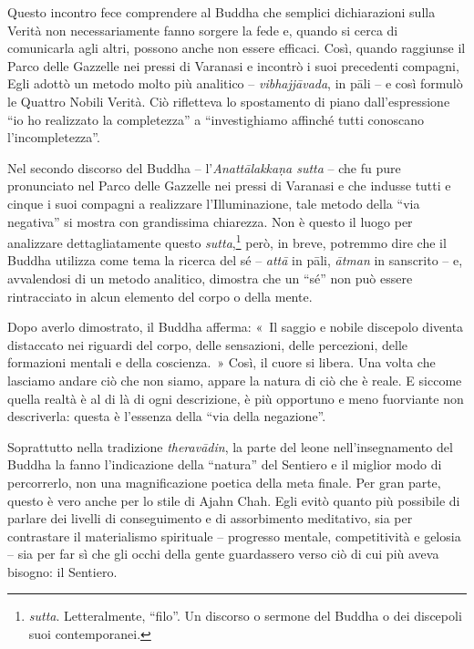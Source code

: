 Questo incontro fece comprendere al Buddha che semplici dichiarazioni
sulla Verità non necessariamente fanno sorgere la fede e, quando si
cerca di comunicarla agli altri, possono anche non essere efficaci.
Così, quando raggiunse il Parco delle Gazzelle nei pressi di Varanasi e
incontrò i suoi precedenti compagni, Egli adottò un metodo molto più
analitico -- \emph{vibhajjāvada}, in pāli -- e così formulò le Quattro
Nobili Verità. Ciò rifletteva lo spostamento di piano dall'espressione
``io ho realizzato la completezza'' a ``investighiamo affinché tutti
conoscano l'incompletezza''.

Nel secondo discorso del Buddha -- l'\emph{Anattālakkaṇa sutta} -- che
fu pure pronunciato nel Parco delle Gazzelle nei pressi di Varanasi e
che indusse tutti e cinque i suoi compagni a realizzare l'Illuminazione,
tale metodo della ``via negativa'' si mostra con grandissima chiarezza.
Non è questo il luogo per analizzare dettagliatamente questo
\emph{sutta},\footnote{\emph{sutta}. Letteralmente, ``filo''. Un
  discorso o sermone del Buddha o dei discepoli suoi contemporanei.}
però, in breve, potremmo dire che il Buddha utilizza come tema la
ricerca del sé -- \emph{attā} in pāli, \emph{ātman} in sanscrito -- e,
avvalendosi di un metodo analitico, dimostra che un ``sé'' non può
essere rintracciato in alcun elemento del corpo o della mente.

Dopo averlo dimostrato, il Buddha afferma: «~Il saggio e nobile
discepolo diventa distaccato nei riguardi del corpo, delle sensazioni,
delle percezioni, delle formazioni mentali e della coscienza.~» Così, il
cuore si libera. Una volta che lasciamo andare ciò che non siamo, appare
la natura di ciò che è reale. E siccome quella realtà è al di là di ogni
descrizione, è più opportuno e meno fuorviante non descriverla: questa è
l'essenza della ``via della negazione''.

Soprattutto nella tradizione \emph{theravādin}, la parte del leone
nell'insegnamento del Buddha la fanno l'indicazione della ``natura'' del
Sentiero e il miglior modo di percorrerlo, non una magnificazione
poetica della meta finale. Per gran parte, questo è vero anche per lo
stile di Ajahn Chah. Egli evitò quanto più possibile di parlare dei
livelli di conseguimento e di assorbimento meditativo, sia per
contrastare il materialismo spirituale -- progresso mentale,
competitività e gelosia -- sia per far sì che gli occhi della gente
guardassero verso ciò di cui più aveva bisogno: il Sentiero.

